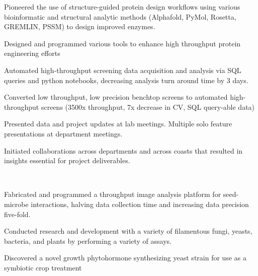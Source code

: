 \documentclass[]{forrest-resume-interfont}
\begin{document}
\begin{tightemize}
    \item Pioneered the use of structure-guided protein design workflows using various bioinformatic and structural analytic methods (Alphafold, PyMol, Rosetta, GREMLIN, PSSM) to design improved enzymes.
    \item Designed and programmed various tools to enhance high throughput protein engineering efforts
    \item Automated high-throughput screening data acquisition and analysis via SQL queries and python notebooks, decreasing analysis turn around time by 3 days.
    \item Converted low throughput, low precision benchtop screens to automated high-throughput screens (3500x throughput, 7x decrease in CV, SQL query-able data)
    \item  Presented data and project updates at lab meetings. Multiple solo feature presentations at department meetings.
    \item Initiated collaborations across departments and across coasts that resulted in insights essential for project deliverables.
\end{tightemize}

\spacesep

\\

\begin{tightemize}
    \item Fabricated and programmed a throughput image analysis platform for seed-microbe interactions, halving data collection time and increasing data precision five-fold.
    \item Conducted research and development with a variety of filamentous fungi, yeasts, bacteria, and plants by performing a variety of assays.
    \item Discovered a novel growth phytohormone synthesizing yeast strain for use as a symbiotic crop treatment
\end{tightemize}
\spacesep
{} 
\\
\end{document}
